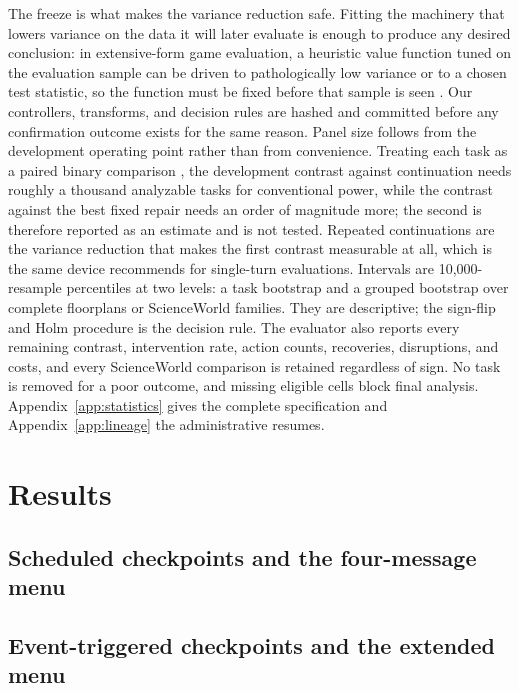 \documentclass{article}
\begin{document}
The freeze is what makes the variance reduction safe. Fitting the machinery that lowers variance on the data it will later evaluate is enough to produce any desired conclusion: in extensive-form game evaluation, a heuristic value function tuned on the evaluation sample can be driven to pathologically low variance or to a chosen test statistic, so the function must be fixed before that sample is seen \citep{kim2026aivat}. Our controllers, transforms, and decision rules are hashed and committed before any confirmation outcome exists for the same reason. Panel size follows from the development operating point rather than from convenience. Treating each task as a paired binary comparison \citep{miller2024errorbars}, the development contrast against continuation needs roughly a thousand analyzable tasks for conventional power, while the contrast against the best fixed repair needs an order of magnitude more; the second is therefore reported as an estimate and is not tested. Repeated continuations are the variance reduction that makes the first contrast measurable at all, which is the same device \citet{miller2024errorbars} recommends for single-turn evaluations. Intervals are 10,000-resample percentiles at two levels: a task bootstrap and a grouped bootstrap over complete floorplans or ScienceWorld families. They are descriptive; the sign-flip and Holm procedure is the decision rule. The evaluator also reports every remaining contrast, intervention rate, action counts, recoveries, disruptions, and costs, and every ScienceWorld comparison is retained regardless of sign. No task is removed for a poor outcome, and missing eligible cells block final analysis. Appendix~\ref{app:statistics} gives the complete specification and Appendix~\ref{app:lineage} the administrative resumes.

\section{Results}
\label{sec:results}

\subsection{Scheduled checkpoints and the four-message menu}


\subsection{Event-triggered checkpoints and the extended menu}
\label{sec:results-r2}

\end{document}
